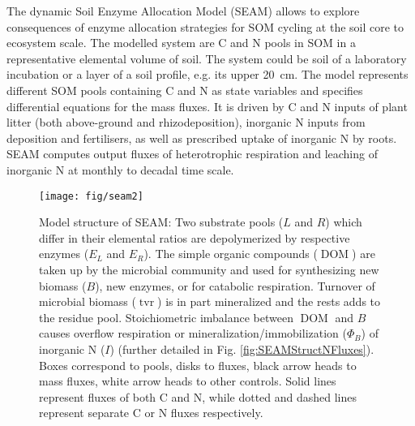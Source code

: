 The dynamic Soil Enzyme Allocation Model (SEAM) allows to explore consequences
of enzyme allocation strategies for SOM cycling at the soil core to ecosystem
scale. The modelled system are C and N pools in SOM in a representative
elemental volume of soil. The system could be soil of a laboratory incubation or
a layer of a soil profile, e.g. its upper 20~\unit{cm}.
The model represents different SOM pools containing C and N as state variables
and specifies differential equations for the mass fluxes. It is driven by C and
N inputs of plant litter (both above-ground and rhizodeposition), inorganic N
inputs from deposition and fertilisers, as well as prescribed
uptake of inorganic N by roots. SEAM computes output fluxes of heterotrophic
respiration and leaching of inorganic N at monthly to decadal time scale.

\begin{figure}[t] \vspace*{2mm}
\begin{center}
\texttt{[image: fig/seam2]}
\end{center}
\caption{
Model structure of SEAM: Two substrate pools ($L$ and $R$) which differ in their
elemental ratios are depolymerized by respective enzymes ($E_L$ and $E_R$). The
simple organic compounds ($\operatorname{DOM}$) are taken up by the microbial
community  and used for synthesizing new biomass (${B}$), new enzymes, or for
catabolic respiration. Turnover of microbial biomass ($\operatorname{tvr}$) is
in part mineralized and the rests adds to the residue pool.
Stoichiometric imbalance between $\operatorname{DOM}$ and ${B}$ causes overflow
respiration or mineralization/immobilization ($\Phi_B$) of inorganic N ($I$)
(further detailed in Fig. \ref{fig:SEAMStructNFluxes}).
Boxes correspond to pools, disks to fluxes, black arrow heads to mass fluxes,
white arrow heads to other controls. Solid lines represent fluxes of both C and
N, while dotted and dashed lines represent separate C or N fluxes respectively.
\label{fig:SEAMStruct}
}
\end{figure}

